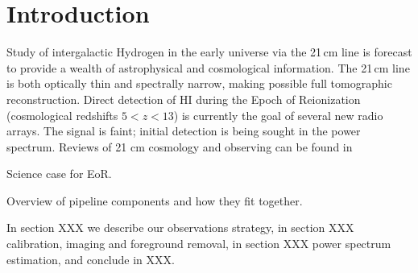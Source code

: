 \section{Introduction} 
  Study of intergalactic Hydrogen  in the early universe via the 21\,cm line is forecast to provide a wealth of astrophysical and cosmological information.  The 21\,cm line is both optically thin and spectrally narrow, making possible full tomographic reconstruction.  Direct detection of HI during the Epoch of Reionization (cosmological redshifts $5<z<13$) is currently the goal of several new radio arrays. The signal is faint; initial detection is being sought in the power spectrum. Reviews of 21 cm cosmology and observing can be found in 




Science case for EoR.

Overview of pipeline components and how they fit together.

In section XXX we describe our observations strategy, in section XXX calibration, imaging and foreground removal, in section XXX power spectrum estimation, and conclude in XXX.